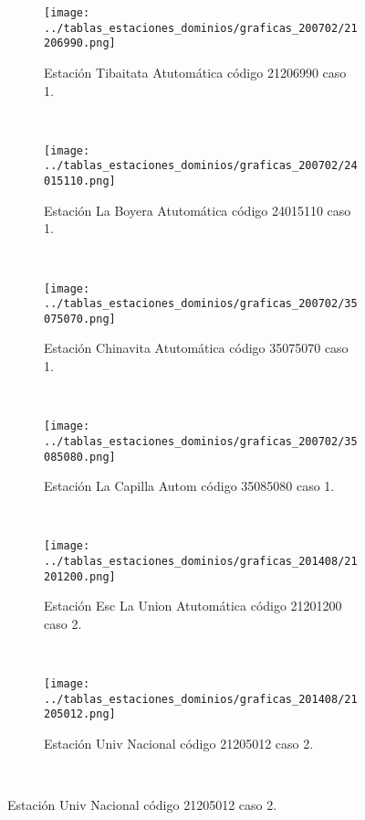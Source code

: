 \begin{figure}[H]\ContinuedFloat
\centering
\begin{subfigure}[normla]{0.4\textwidth}
\texttt{[image: ../tablas\_estaciones\_dominios/graficas\_200702/21206990.png]}
\caption{Estación Tibaitata Atutomática código 21206990 caso 1.}
\end{subfigure}
~
\begin{subfigure}[normla]{0.4\textwidth}
\texttt{[image: ../tablas\_estaciones\_dominios/graficas\_200702/24015110.png]}
\caption{Estación La Boyera Atutomática código 24015110 caso 1.}
\end{subfigure}
~
\begin{subfigure}[normla]{0.4\textwidth}
\texttt{[image: ../tablas\_estaciones\_dominios/graficas\_200702/35075070.png]}
\caption{Estación Chinavita Atutomática código 35075070 caso 1.}
\end{subfigure}
~
\begin{subfigure}[normla]{0.4\textwidth}
\texttt{[image: ../tablas\_estaciones\_dominios/graficas\_200702/35085080.png]}
\caption{Estación La Capilla Autom código 35085080 caso 1.}
\end{subfigure}
~
\begin{subfigure}[normla]{0.4\textwidth}
\texttt{[image: ../tablas\_estaciones\_dominios/graficas\_201408/21201200.png]}
\caption{Estación Esc La Union Atutomática código 21201200 caso 2.}
\end{subfigure}
~
\begin{subfigure}[normla]{0.4\textwidth}
\texttt{[image: ../tablas\_estaciones\_dominios/graficas\_201408/21205012.png]}
\caption{Estación Univ Nacional código 21205012 caso 2.}
\end{subfigure}
~
\end{figure}
 
